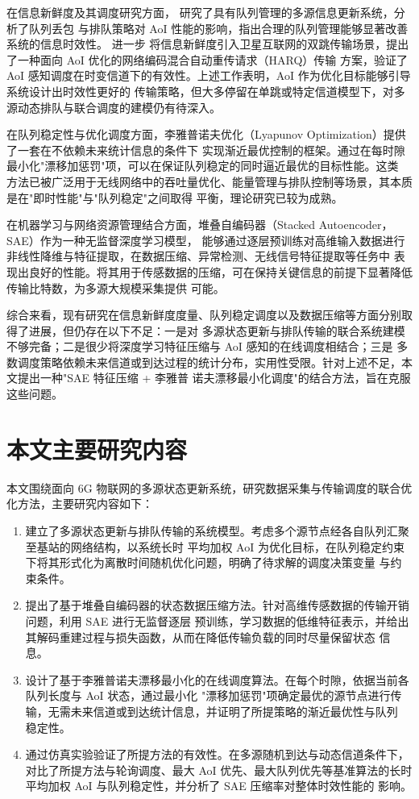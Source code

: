 在信息新鲜度及其调度研究方面，\cite{2015-Pappas-ICC} 研究了具有队列管理的多源信息更新系统，分析了队列丢包
与排队策略对 AoI 性能的影响，指出合理的队列管理能够显著改善系统的信息时效性。\cite{2022-Jiao-TVT} 进一步
将信息新鲜度引入卫星互联网的双跳传输场景，提出了一种面向 AoI 优化的网络编码混合自动重传请求（HARQ）传输
方案，验证了 AoI 感知调度在时变信道下的有效性。上述工作表明，AoI 作为优化目标能够引导系统设计出时效性更好的
传输策略，但大多停留在单跳或特定信道模型下，对多源动态排队与联合调度的建模仍有待深入。

在队列稳定性与优化调度方面，李雅普诺夫优化（Lyapunov Optimization）提供了一套在不依赖未来统计信息的条件下
实现渐近最优控制的框架。通过在每时隙最小化"漂移加惩罚"项，可以在保证队列稳定的同时逼近最优的目标性能。这类
方法已被广泛用于无线网络中的吞吐量优化、能量管理与排队控制等场景，其本质是在"即时性能"与"队列稳定"之间取得
平衡，理论研究已较为成熟。

在机器学习与网络资源管理结合方面，堆叠自编码器（Stacked Autoencoder，SAE）作为一种无监督深度学习模型，
能够通过逐层预训练对高维输入数据进行非线性降维与特征提取，在数据压缩、异常检测、无线信号特征提取等任务中
表现出良好的性能。将其用于传感数据的压缩，可在保持关键信息的前提下显著降低传输比特数，为多源大规模采集提供
可能。

综合来看，现有研究在信息新鲜度度量、队列稳定调度以及数据压缩等方面分别取得了进展，但仍存在以下不足：一是对
多源状态更新与排队传输的联合系统建模不够完备；二是很少将深度学习特征压缩与 AoI 感知的在线调度相结合；三是
多数调度策略依赖未来信道或到达过程的统计分布，实用性受限。针对上述不足，本文提出一种"SAE 特征压缩 + 李雅普
诺夫漂移最小化调度"的结合方法，旨在克服这些问题。

\section{本文主要研究内容}

本文围绕面向 6G 物联网的多源状态更新系统，研究数据采集与传输调度的联合优化方法，主要研究内容如下：

\begin{enumerate}
  \item 建立了多源状态更新与排队传输的系统模型。考虑多个源节点经各自队列汇聚至基站的网络结构，以系统长时
        平均加权 AoI 为优化目标，在队列稳定约束下将其形式化为离散时间随机优化问题，明确了待求解的调度决策变量
        与约束条件。
  \item 提出了基于堆叠自编码器的状态数据压缩方法。针对高维传感数据的传输开销问题，利用 SAE 进行无监督逐层
        预训练，学习数据的低维特征表示，并给出其解码重建过程与损失函数，从而在降低传输负载的同时尽量保留状态
        信息。
  \item 设计了基于李雅普诺夫漂移最小化的在线调度算法。在每个时隙，依据当前各队列长度与 AoI 状态，通过最小化
        "漂移加惩罚"项确定最优的源节点进行传输，无需未来信道或到达统计信息，并证明了所提策略的渐近最优性与队列
        稳定性。
  \item 通过仿真实验验证了所提方法的有效性。在多源随机到达与动态信道条件下，对比了所提方法与轮询调度、最大
        AoI 优先、最大队列优先等基准算法的长时平均加权 AoI 与队列稳定性，并分析了 SAE 压缩率对整体时效性能的
        影响。
\end{enumerate}

